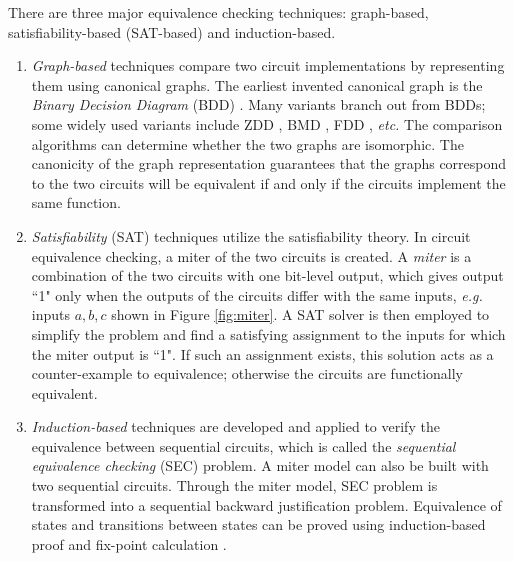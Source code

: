 There are three major
equivalence checking techniques: graph-based,
satisfiability-based (SAT-based) and induction-based.
\begin{enumerate}[{1)}]
\item \emph{Graph-based} techniques compare two circuit implementations 
by representing them using canonical graphs. 
The earliest invented canonical graph is the \emph{Binary Decision Diagram} (BDD) \cite{BRYA86}.
Many variants branch out from BDDs; some widely used variants include 
ZDD \cite{minato1993zero}, BMD \cite{bmd}, FDD \cite{okfdd}, {\it etc.} The comparison algorithms can 
determine whether the two graphs are isomorphic. The canonicity of the graph representation guarantees that
the graphs correspond to the two circuits will be 
equivalent if and only if the circuits implement the same function.
\item \emph{Satisfiability} (SAT) techniques utilize the satisfiability theory.
In circuit equivalence checking, a miter of the two circuits is created.
A \emph{miter} is a combination of the two circuits with one bit-level output, which 
gives output ``1" only when the outputs of the circuits differ with 
the same inputs, {\it e.g. }inputs $a,b,c$ shown in Figure \ref{fig:miter}. 
A SAT solver \cite{csat,mishchenko2006improvements} is then employed to simplify the problem 
and find a satisfying assignment to the inputs for which the 
miter output is ``1". If such an assignment exists, this solution acts as a 
counter-example to equivalence; otherwise the circuits
are functionally equivalent.
\item \emph{Induction-based} techniques are developed and applied to verify the 
equivalence between sequential circuits, which is called the {\it sequential equivalence checking}
(SEC) problem. A miter model can also be built with two sequential circuits. Through the 
miter model, SEC problem is transformed into a sequential backward justification problem.
Equivalence of states and transitions between states can be proved using induction-based 
proof and fix-point calculation \cite{bjesse2000sat,stoffel1997record}.
\end{enumerate}


\begin{figure}[h]
\end{figure}

